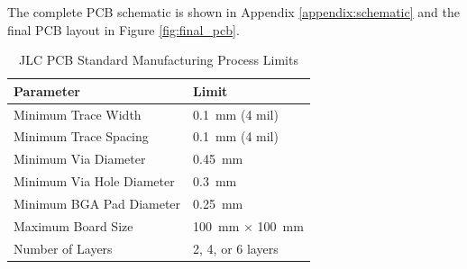 The complete PCB schematic is shown in Appendix \ref{appendix:schematic} and the final PCB layout in Figure \ref{fig:final_pcb}.

\begin{table}[H]
    \centering
    \caption{JLC PCB Standard Manufacturing Process Limits}
    \label{tab:jlc_limits}
    \begin{tabular}{ll}
        \hline
        \textbf{Parameter} & \textbf{Limit} \\
        \hline
        Minimum Trace Width & \SI{0.1}{\milli\meter} (4 mil) \\
        Minimum Trace Spacing & \SI{0.1}{\milli\meter} (4 mil) \\
        Minimum Via Diameter & \SI{0.45}{\milli\meter} \\
        Minimum Via Hole Diameter & \SI{0.3}{\milli\meter} \\
        Minimum BGA Pad Diameter & \SI{0.25}{\milli\meter} \\
        Maximum Board Size & \SI{100}{\milli\meter} × \SI{100}{\milli\meter} \\
        Number of Layers & 2, 4, or 6 layers \\
        \hline
    \end{tabular}
\end{table}

